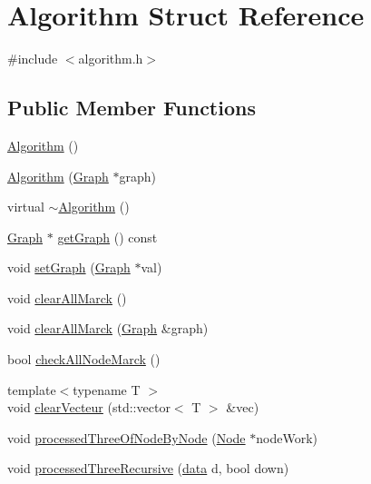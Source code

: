 \hypertarget{struct_algorithm}{}\section{Algorithm Struct Reference}
\label{struct_algorithm}


{\ttfamily \#include $<$algorithm.\+h$>$}

\subsection*{Public Member Functions}
\begin{DoxyCompactItemize}
\item 
\mbox{\hyperlink{struct_algorithm_a472bdce2086324f49da7794e27ccaa54}{Algorithm}} ()
\item 
\mbox{\hyperlink{struct_algorithm_a5b56b8a7a5f4ebdd05f9e75862eedd3f}{Algorithm}} (\mbox{\hyperlink{class_graph}{Graph}} $\ast$graph)
\item 
virtual \mbox{\hyperlink{struct_algorithm_a6b8fe18068ca11c37d7efc9f4ae0794d}{$\sim$\+Algorithm}} ()
\item 
\mbox{\hyperlink{class_graph}{Graph}} $\ast$ \mbox{\hyperlink{struct_algorithm_a9589dba6e57847783c9ef56891e0346b}{get\+Graph}} () const
\item 
void \mbox{\hyperlink{struct_algorithm_aa02d10ce76cebfcb8dbca2596181d196}{set\+Graph}} (\mbox{\hyperlink{class_graph}{Graph}} $\ast$val)
\item 
void \mbox{\hyperlink{struct_algorithm_a86fac96d365d99c0a210f060a1daa67c}{clear\+All\+Marck}} ()
\item 
void \mbox{\hyperlink{struct_algorithm_ae9a908eaca25badea660fc00644e66a3}{clear\+All\+Marck}} (\mbox{\hyperlink{class_graph}{Graph}} \&graph)
\item 
bool \mbox{\hyperlink{struct_algorithm_aee02f753076dd71f76d029249c2e1e22}{check\+All\+Node\+Marck}} ()
\item 
{\footnotesize template$<$typename T $>$ }\\void \mbox{\hyperlink{struct_algorithm_a929117c2d005410de6883ad36330328b}{clear\+Vecteur}} (std\+::vector$<$ T $>$ \&vec)
\item 
void \mbox{\hyperlink{struct_algorithm_aa921d8fcc6fa4f434f19c800cda14511}{processed\+Three\+Of\+Node\+By\+Node}} (\mbox{\hyperlink{class_node}{Node}} $\ast$node\+Work)
\item 
void \mbox{\hyperlink{struct_algorithm_a6194b1be053438237fcdbd91fce6e8b0}{processed\+Three\+Recursive}} (\mbox{\hyperlink{_graph_8h_a98cbe1f79429fc62806b32b6e8871d9e}{data}} d, bool down)

\end{DoxyCompactItemize}

